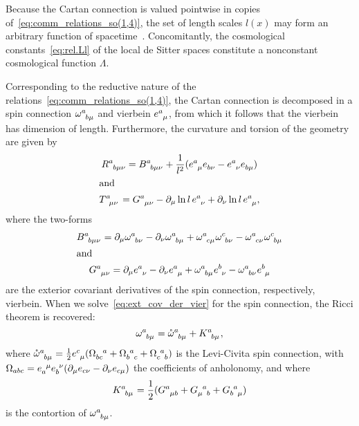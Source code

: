 \documentclass[%
5p,
times,
sort&compress
]{elsarticle}
\newcommand{\ind}{\indices}
\def\pd{\partial}
\def\mring{\mathring}
\begin{document}
Because the Cartan connection is valued pointwise in copies 
of~\eqref{eq:comm_relations_so(1,4)}, the set of length scales 
$l(x)$ may form an arbitrary function of 
spacetime~\cite{Jennen:2014mba, Westman:2014yca}. Concomitantly, 
the cosmological constants~\eqref{eq:rel.Ll} of the local de 
Sitter spaces constitute a nonconstant cosmological function 
$\Lambda$.

Corresponding to the reductive nature of the 
relations~\eqref{eq:comm_relations_so(1,4)}, the Cartan 
connection is decomposed in a spin connection 
$\omega\ind{^a_{b\mu}}$ and vierbein $e\ind{^a_\mu}$, from which 
it follows that the vierbein has dimension of length.  
Furthermore, the curvature and torsion of the geometry are given 
by~\cite{Jennen:2014mba}
\begin{gather}
\label{eq:nonlin_curv_dSC}
  R\ind{^a_{b\mu\nu}} = B\ind{^a_{b\mu\nu}} + \frac{1}{l^2} 
  (e\ind{^a_\mu} e\ind{_{b\nu}} - e\ind{^a_\nu} e\ind{_{b\mu}})
  \\
\shortintertext{and}
\label{eq:nonlin_tors_dSC}
  T\ind{^a_{\mu\nu}} = G\ind{^a_{\mu\nu}} - \pd_\mu \ln l\, 
  e\ind{^a_\nu} + \pd_\nu \ln l\, e\ind{^a_\mu},
\end{gather}
where the two-forms
\begin{gather}
\label{eq:ext_cov_der_spin}
  B\ind{^a_{b\mu\nu}} = \pd_\mu \omega\ind{^a_{b\nu}} - \pd_\nu 
  \omega\ind{^a_{b\mu}} + \omega\ind{^a_{c\mu}} 
  \omega\ind{^c_{b\nu}} - \omega\ind{^a_{c\nu}} 
  \omega\ind{^c_{b\mu}}\\
\shortintertext{and}
\label{eq:ext_cov_der_vier}
  G\ind{^a_{\mu\nu}} = \pd_\mu e\ind{^a_\nu} - \pd_\nu 
  e\ind{^a_\mu} + \omega\ind{^a_{b\mu}} e\ind{^b_\nu} 
  - \omega\ind{^a_{b\nu}} e\ind{^b_\mu}
\end{gather}
are the exterior covariant derivatives of the spin connection, 
respectively, vierbein. When we solve~\eqref{eq:ext_cov_der_vier} 
for the spin connection, the Ricci theorem is recovered:
\begin{equation}
\label{eq:RicciTheor}
  \omega\ind{^a_{b\mu}} = \mring{\omega}\ind{^a_{b\mu}} 
  + K\ind{^a_{b\mu}},
\end{equation}
where $\mring{\omega}\ind{^a_{b\mu}} 
= \tfrac{1}{2}e\ind{^c_\mu}(\Omega\ind{_{bc}^a} 
+ \Omega\ind{_b^a_c} + \Omega\ind{_c^a_b})$ is the Levi-Civita 
spin connection, with $\Omega_{abc}  = e\ind{_a^\mu} 
e\ind{_b^\nu}(\pd_\mu e_{c\nu} - \pd_\nu e_{c\mu})$ the 
coefficients of anholonomy, and where
\begin{equation}
\label{eq:relContTors}
  K\ind{^a_{b\mu}} = \frac{1}{2} (G\ind{^a_{\mu b}} 
  + G\ind{_\mu^a_b} + G\ind{_b^a_\mu})
\end{equation}
is the contortion of $\omega\ind{^a_{b\mu}}$.
\end{document}
